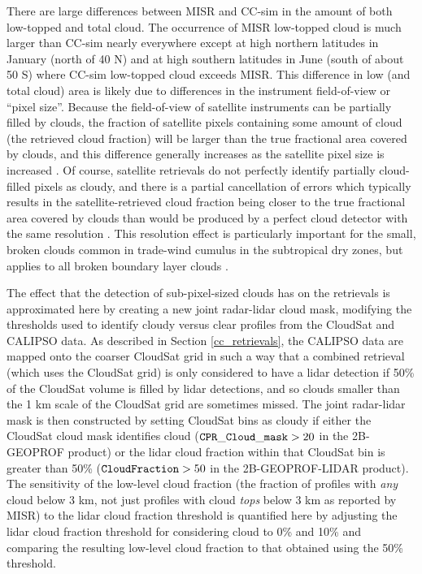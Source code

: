 There are large differences between MISR and CC-sim in the amount of both low-topped and total cloud. The occurrence of MISR low-topped cloud is much larger than CC-sim nearly everywhere except at high northern latitudes in January (north of 40 N) and at high southern latitudes in June (south of about 50 S) where CC-sim low-topped cloud exceeds MISR. This difference in low (and total cloud) area is likely due to differences in the instrument field-of-view or ``pixel size''. Because the field-of-view of satellite instruments can be partially filled by clouds, the fraction of satellite pixels containing some amount of cloud (the retrieved cloud fraction) will be larger than the true fractional area covered by clouds, and this difference generally increases as the satellite pixel size is increased \citep{digirolamo_and_davies_1997}. Of course, satellite retrievals do not perfectly identify partially cloud-filled pixels as cloudy, and there is a partial cancellation of errors which typically results in the satellite-retrieved cloud fraction being closer to the true fractional area covered by clouds than would be produced by a perfect cloud detector with the same resolution \citep{wielicki_and_parker_1992}. This resolution effect is particularly important for the small, broken clouds common in trade-wind cumulus in the subtropical dry zones, but applies to all broken boundary layer clouds \citep{zhao_and_digirolamo_2006, marchand_et_al_2010}. 

The effect that the detection of sub-pixel-sized clouds has on the retrievals is approximated here by creating a new joint radar-lidar cloud mask, modifying the thresholds used to identify cloudy versus clear profiles from the CloudSat and CALIPSO data. As described in Section \ref{cc_retrievals}, the CALIPSO data are mapped onto the coarser CloudSat grid in such a way that a combined retrieval (which uses the CloudSat grid) is only considered to have a lidar detection if 50\% of the CloudSat volume is filled by lidar detections, and so clouds smaller than the 1 km scale of the CloudSat grid are sometimes missed. The joint radar-lidar mask is then constructed by setting CloudSat bins as cloudy if either the CloudSat cloud mask identifies cloud (${\tt CPR\_Cloud\_mask} > 20$ in the 2B-GEOPROF product) or the lidar cloud fraction within that CloudSat bin is greater than 50\% (${\tt CloudFraction} > 50$ in the 2B-GEOPROF-LIDAR product). The sensitivity of the low-level cloud fraction (the fraction of profiles with \emph{any} cloud below 3 km, not just profiles with cloud \emph{tops} below 3 km as reported by MISR) to the lidar cloud fraction threshold is quantified here by adjusting the lidar cloud fraction threshold for considering cloud to 0\% and 10\% and comparing the resulting low-level cloud fraction to that obtained using the 50\% threshold.

